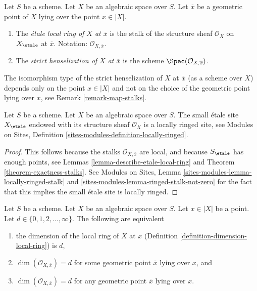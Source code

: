 \begin{definition}
\label{definition-etale-local-rings}
Let $S$ be a scheme.
Let $X$ be an algebraic space over $S$.
Let $\overline{x}$ be a geometric point of $X$ lying over the point
$x \in |X|$.
\begin{enumerate}
\item The {\it \'etale local ring of $X$ at $\overline{x}$}
is the stalk of the structure sheaf $\mathcal{O}_X$ on $X_\etale$
at $\overline{x}$.
Notation: $\mathcal{O}_{X, \overline{x}}$.
\item The {\it strict henselization of $X$ at $\overline{x}$}
is the scheme $\Spec(\mathcal{O}_{X, \overline{x}})$.
\end{enumerate}
\end{definition}

\noindent
The isomorphism type of the strict henselization of $X$ at $\overline{x}$
(as a scheme over $X$) depends only on the point $x \in |X|$ and not on
the choice of the geometric point lying over $x$, see
Remark \ref{remark-map-stalks}.

\begin{lemma}
\label{lemma-etale-site-locally-ringed}
Let $S$ be a scheme.
Let $X$ be an algebraic space over $S$.
The small \'etale site $X_\etale$ endowed with its
structure sheaf $\mathcal{O}_X$ is a locally ringed site, see
Modules on Sites, Definition \ref{sites-modules-definition-locally-ringed}.
\end{lemma}

\begin{proof}
This follows because the stalks
$\mathcal{O}_{X, \overline{x}}$ are
local, and because $S_\etale$ has enough points, see
Lemmas \ref{lemma-describe-etale-local-ring} and
Theorem \ref{theorem-exactness-stalks}.
See
Modules on Sites, Lemma \ref{sites-modules-lemma-locally-ringed-stalk} and
\ref{sites-modules-lemma-ringed-stalk-not-zero}
for the fact that this implies the small \'etale site is locally ringed.
\end{proof}

\begin{lemma}
\label{lemma-dimension-local-ring}
Let $S$ be a scheme. Let $X$ be an algebraic space over $S$.
Let $x \in |X|$ be a point. Let $d \in \{0, 1, 2, \ldots, \infty\}$.
The following are equivalent
\begin{enumerate}
\item the dimension of the local ring of $X$ at $x$
(Definition \ref{definition-dimension-local-ring}) is $d$,
\item $\dim(\mathcal{O}_{X, \overline{x}}) = d$ for some geometric
point $\overline{x}$ lying over $x$, and
\item $\dim(\mathcal{O}_{X, \overline{x}}) = d$ for any geometric
point $\overline{x}$ lying over $x$.
\end{enumerate}
\end{lemma}

